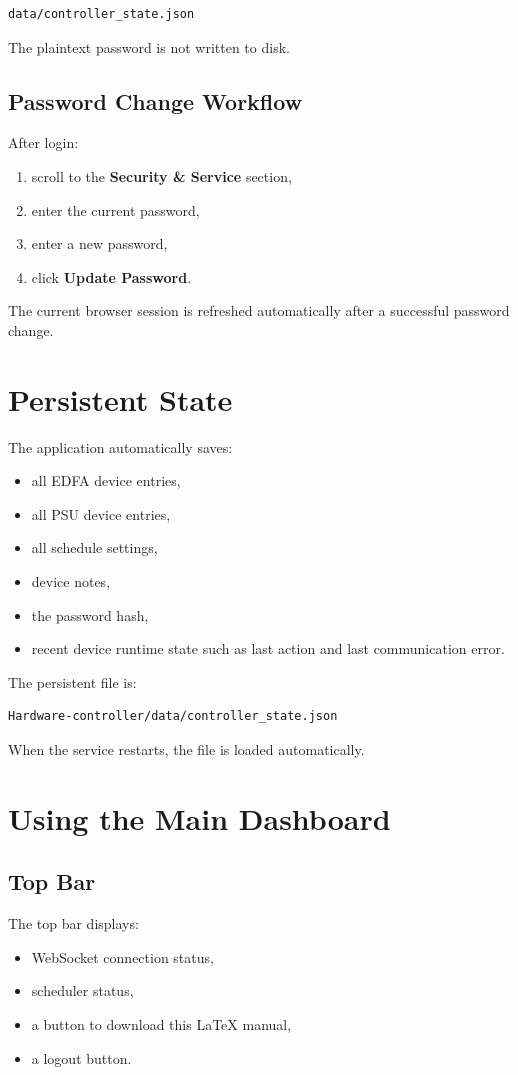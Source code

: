 \documentclass[11pt,a4paper]{article}
\begin{document}
\begin{lstlisting}[style=migacode]
data/controller_state.json
\end{lstlisting}

The plaintext password is not written to disk.

\subsection{Password Change Workflow}
After login:
\begin{enumerate}[leftmargin=1.5em]
    \item scroll to the \textbf{Security \& Service} section,
    \item enter the current password,
    \item enter a new password,
    \item click \textbf{Update Password}.
\end{enumerate}

The current browser session is refreshed automatically after a successful password change.

\section{Persistent State}
The application automatically saves:
\begin{itemize}[leftmargin=1.5em]
    \item all EDFA device entries,
    \item all PSU device entries,
    \item all schedule settings,
    \item device notes,
    \item the password hash,
    \item recent device runtime state such as last action and last communication error.
\end{itemize}

The persistent file is:

\begin{lstlisting}[style=migacode]
Hardware-controller/data/controller_state.json
\end{lstlisting}

When the service restarts, the file is loaded automatically.

\section{Using the Main Dashboard}
\subsection{Top Bar}
The top bar displays:
\begin{itemize}[leftmargin=1.5em]
    \item WebSocket connection status,
    \item scheduler status,
    \item a button to download this \LaTeX{} manual,
    \item a logout button.
\end{itemize}
\end{document}
